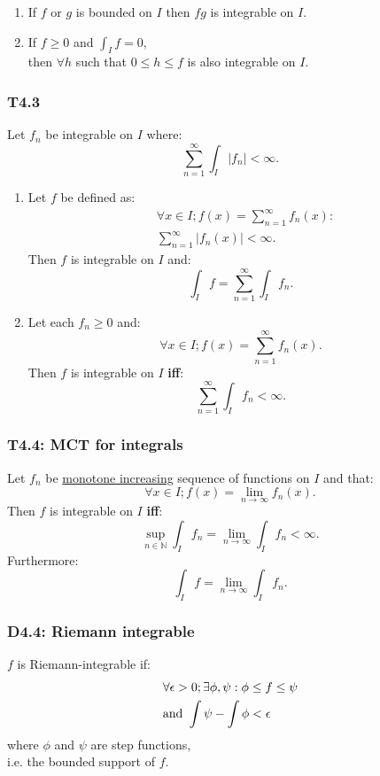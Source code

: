 \documentclass{article}
\begin{document}
\begin{multicols*}{3}
\begin{enumerate}
    \item If $f$ or $g$ is bounded on $I$
    then $fg$ is integrable on $I$.

    \item If $f\geq0$ and $\displaystyle\int_I f=0$, \\
    then $\forall h$ such that 
    $0\leq h\leq f$ is also integrable on $I$.
\end{enumerate}

\subsubsection*{T4.3}
Let $f_n$ be integrable on $I$ where:
$$\sum_{n=1}^{\infty}\int_I |f_n|<\infty.$$
\begin{enumerate}
    \item Let $f$ be defined as:
    \begin{align*}
        &\forall x\in I;f(x)=\sum_{n=1}^{\infty}f_n(x)
        : \\ &\sum_{n=1}^{\infty}|f_n(x)|<\infty.
    \end{align*}
    Then $f$ is integrable on $I$ and:
    $$\int_I f=\sum_{n=1}^{\infty}\int_I f_n.$$

    \item Let each $f_n\geq0$ and:
    $$\forall x\in I; f(x)=\sum_{n=1}^{\infty}f_n(x).$$
    Then $f$ is integrable on $I$ \textbf{if{}f}:
    $$\sum_{n=1}^{\infty}\int_I f_n<\infty.$$
\end{enumerate}

\subsubsection*{T4.4: MCT for integrals}
Let $f_n$ be \underline{monotone increasing}
sequence of functions on $I$ and that:
$$\forall x\in I;f(x)=\lim_{n\rightarrow\infty}f_n(x).$$
Then $f$ is integrable on $I$ \textbf{if{}f}:
$$\sup_{n\in\mathbb{N}}\int_I f_n
=\lim_{n\rightarrow\infty}\int_I f_n<\infty.$$
Furthermore:
$$\int_I f=\lim_{n\rightarrow\infty}\int_I f_n.$$

\subsubsection*{D4.4: Riemann integrable}
$f$ is Riemann-integrable if:
\begin{align*}
    &\forall\epsilon>0; \exists\phi,
    \psi:\phi\leq f\leq\psi \\
    &\text{and}\hspace*{0.05in}
    \int\psi-\int\phi<\epsilon
\end{align*}
where $\phi$ and $\psi$ are step functions, \\
i.e. the bounded support of $f$.


\end{multicols*}
\end{document}
